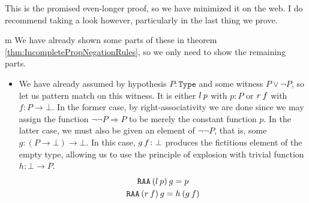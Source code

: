 \documentclass[11pt]{article}
\begin{document}
This is the promised even-longer proof, so we have minimized it on the web. I do recommend taking a look however, particularly in the last thing we prove.

\begin{my proof}{m}
We have already shown some parts of these in theorem \ref{thm:IncompletePropNegationRules}, so we only need to show the remaining parts.

\begin{itemize}

\item We have already assumed by hypothesis $P \colon \mathtt{Type}$ and some witness $P \vee \neg P$, so let us pattern match on this witness. It is either $l \hspace{0.2em} p$ with $p \colon P$ or $r \hspace{0.2em} f$ with $f \colon P \to \bot$. In the former case, by right-associativity we are done since we may assign the function $\neg \neg P \Rightarrow P$ to be merely the constant function $p$. In the latter case, we must also be given an element of $\neg \neg P$, that is, some $g\colon (P \to \bot) \to \bot$. In this case, $g \hspace{0.2em} f \colon \bot$ produces the fictitious element of the empty type, allowing us to use the principle of explosion with trivial function $h \colon \bot \to P$. \begin{gather*}
\mathtt{RAA} \hspace{0.2em} (l \hspace{0.2em} p) \hspace{0.2em} g = p \\
\mathtt{RAA} \hspace{0.2em} (r \hspace{0.2em} f) \hspace{0.2em} g = h \hspace{0.2em} (g \hspace{0.2em} f)
\end{gather*}



\end{itemize}
\end{my proof}
\end{document}
